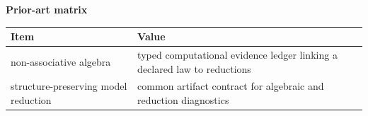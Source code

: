 \begin{center}
\textbf{Prior-art matrix}\par\smallskip
\begin{tabular}{ll}
\toprule
Item & Value \\
\midrule
non-associative algebra & typed computational evidence ledger linking a declared law to reductions \\
structure-preserving model reduction & common artifact contract for algebraic and reduction diagnostics \\
\bottomrule
\end{tabular}
\end{center}

